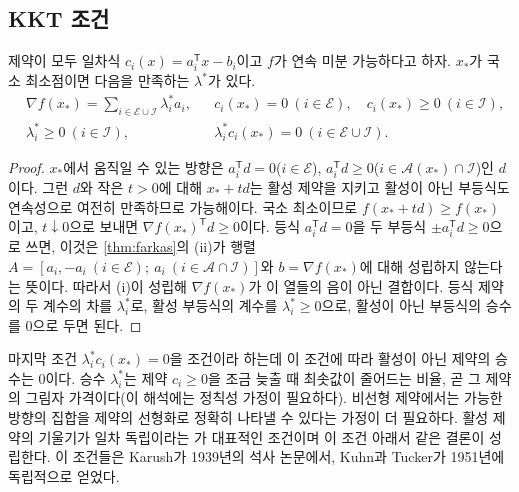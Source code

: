 \subsection{KKT 조건}

\begin{theorem}
\label{thm:kkt-linear}
제약이 모두 일차식 $c_i(x)=a_i^{\mathsf T}x-b_i$이고 $f$가 연속 미분 가능하다고 하자. $x_\ast$가 국소 최소점이면 다음을 만족하는 $\lambda^\ast$가 있다.
\begin{align*}
&\nabla f(x_\ast)=\sum_{i\in\mathcal E\cup\mathcal I}\lambda_i^\ast a_i,&&c_i(x_\ast)=0\ (i\in\mathcal E),\quad c_i(x_\ast)\ge0\ (i\in\mathcal I),\\
&\lambda_i^\ast\ge0\ (i\in\mathcal I),&&\lambda_i^\ast c_i(x_\ast)=0\ (i\in\mathcal E\cup\mathcal I).
\end{align*}
\end{theorem}

\begin{proof}
$x_\ast$에서 움직일 수 있는 방향은 $a_i^{\mathsf T}d=0$($i\in\mathcal E$), $a_i^{\mathsf T}d\ge0$($i\in\mathcal A(x_\ast)\cap\mathcal I$)인 $d$이다. 그런 $d$와 작은 $t>0$에 대해 $x_\ast+td$는 활성 제약을 지키고 활성이 아닌 부등식도 연속성으로 여전히 만족하므로 가능해이다. 국소 최소이므로 $f(x_\ast+td)\ge f(x_\ast)$이고, $t\downarrow0$으로 보내면 $\nabla f(x_\ast)^{\mathsf T}d\ge0$이다. 등식 $a_i^{\mathsf T}d=0$을 두 부등식 $\pm a_i^{\mathsf T}d\ge0$으로 쓰면, 이것은 \cref{thm:farkas}의 (ii)가 행렬 $A=[a_i,-a_i\ (i\in\mathcal E);\ a_i\ (i\in\mathcal A\cap\mathcal I)]$와 $b=\nabla f(x_\ast)$에 대해 성립하지 않는다는 뜻이다. 따라서 (i)이 성립해 $\nabla f(x_\ast)$가 이 열들의 음이 아닌 결합이다. 등식 제약의 두 계수의 차를 $\lambda_i^\ast$로, 활성 부등식의 계수를 $\lambda_i^\ast\ge0$으로, 활성이 아닌 부등식의 승수를 $0$으로 두면 된다.
\end{proof}

마지막 조건 $\lambda_i^\ast c_i(x_\ast)=0$을  조건이라 하는데 이 조건에 따라 활성이 아닌 제약의 승수는 $0$이다. 승수 $\lambda_i^\ast$는 제약 $c_i\ge0$을 조금 늦출 때 최솟값이 줄어드는 비율, 곧 그 제약의 그림자 가격이다(이 해석에는 정칙성 가정이 필요하다). 비선형 제약에서는 가능한 방향의 집합을 제약의 선형화로 정확히 나타낼 수 있다는 가정이 더 필요하다. 활성 제약의 기울기가 일차 독립이라는 가 대표적인 조건이며 이 조건 아래서 같은 결론이 성립한다\cite{nocedal2006}. 이 조건들은 Karush가 1939년의 석사 논문에서\cite{karush1939}, Kuhn과 Tucker가 1951년에 독립적으로 얻었다\cite{kuhn1951}.

